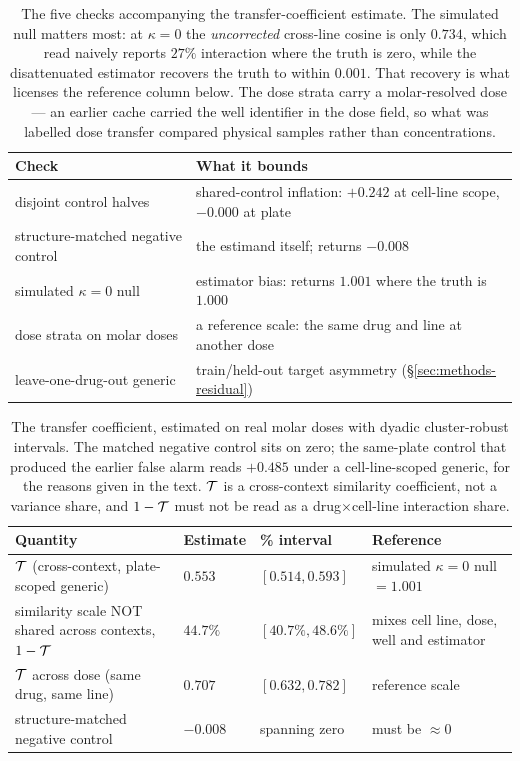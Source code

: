 \begin{table}[htbp]
\centering
\footnotesize
\begin{tabularx}{\textwidth}{@{}>{\raggedright\arraybackslash}p{}X@{}}
\toprule
Check & What it bounds \\
\midrule
disjoint control halves & shared-control inflation: $+0.242$ at cell-line scope, $-0.000$ at plate \\
structure-matched negative control & the estimand itself; returns $-0.008$ \\
simulated $\kappa{=}0$ null & estimator bias: returns $1.001$ where the truth is $1.000$ \\
dose strata on molar doses & a reference scale: the same drug and line at another dose \\
leave-one-drug-out generic & train/held-out target asymmetry (\S\ref{sec:methods-residual}) \\
\bottomrule
\end{tabularx}
\caption{The five checks accompanying the transfer-coefficient estimate. The simulated null matters
most: at $\kappa = 0$ the \emph{uncorrected} cross-line cosine is only $0.734$, which read naively
reports $27\%$ interaction where the truth is zero, while the disattenuated estimator recovers the
truth to within $0.001$. That recovery is what licenses the reference column below. The dose strata carry a molar-resolved dose --- an earlier
cache carried the well identifier in the dose field, so what was labelled dose transfer compared
physical samples rather than concentrations.}
\label{tab:tcontrols}
\end{table}

\begin{table}[htbp]
\centering
\footnotesize
\begin{tabularx}{\textwidth}{@{}>{\raggedright\arraybackslash}p{}
  >{\centering\arraybackslash}p{}
  >{\centering\arraybackslash}p{}X@{}}
\toprule
Quantity & Estimate & 95\% interval & Reference \\
\midrule
$\mathcal{T}$ (cross-context, plate-scoped generic) & $0.553$ & $[0.514, 0.593]$ & simulated $\kappa{=}0$ null $= 1.001$ \\
similarity scale NOT shared across contexts, $1-\mathcal{T}$ & $44.7\%$ & $[40.7\%, 48.6\%]$ &
mixes cell line, dose, well and estimator \\
$\mathcal{T}$ across dose (same drug, same line) & $0.707$ & $[0.632, 0.782]$ & reference scale \\
structure-matched negative control & $-0.008$ & spanning zero & must be $\approx 0$ \\
\bottomrule
\end{tabularx}
\caption{The transfer coefficient, estimated on real molar doses with dyadic cluster-robust
intervals. The matched negative control sits on zero; the same-plate control that produced the
earlier false alarm reads $+0.485$ under a cell-line-scoped generic, for the reasons given in the
text. $\mathcal{T}$ is a cross-context similarity coefficient, not a variance share, and $1 - \mathcal{T}$
must not be read as a drug$\times$cell-line interaction share.}
\label{tab:transfer}
\end{table}


